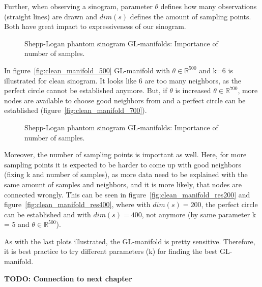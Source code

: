 Further, when observing a sinogram, parameter $\theta$ defines how many observations (straight lines) are drawn
and $dim(s)$ defines the amount of sampling points. Both have great impact to expressiveness of our sinogram.

\begin{figure}[H]
    \centering
    \caption{Shepp-Logan phantom sinogram GL-manifolds: Importance of number of samples.}
\end{figure}

In figure~\ref{fig:clean_manifold_500} GL-manifold with $\theta \in \mathbb{R}^{500}$ and k=6 is illustrated
for clean sinogram. It looks like 6 are too many neighbors, as the perfect circle cannot be established anymore.
But, if $\theta$ is increased $\theta \in \mathbb{R}^{700}$, more nodes are available to choose good neighbors from
and a perfect circle can be established (figure~\ref{fig:clean_manifold_700}).

\begin{figure}[H]
    \centering
    \caption{Shepp-Logan phantom sinogram GL-manifolds: Importance of number of samples.}
\end{figure}

Moreover, the number of sampling points is important as well.
Here, for more sampling points it is expected to be harder to come up with good neighbors (fixing k and number of samples),
as more data need to be explained with the same amount of samples and neighbors, and it is more likely, that nodes are connected wrongly.
This can be seen in figure~\ref{fig:clean_manifold_res200} and figure~\ref{fig:clean_manifold_res400}, where with $dim(s) = 200$,
the perfect circle can be established and with $dim(s) = 400$, not anymore (by same parameter k = 5 and $\theta \in \mathbb{R}^{500}$).

\begin{tcolorbox}[colback=red!5!white,colframe=red!75!black]
    As with the last plots illustrated, the GL-manifold is pretty sensitive.
    Therefore, it is best practice to try different parameters (k) for finding the best 
    GL-manifold.
\end{tcolorbox}



\textbf{TODO: Connection to next chapter}